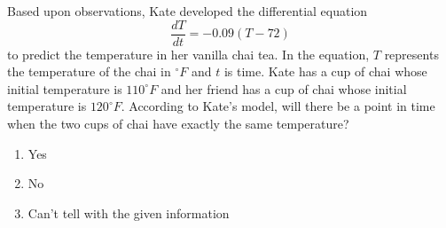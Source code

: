 \begin{problem}
    Based upon observations, Kate developed the differential equation 
    \[ \frac{dT}{dt}= -0.09(T-72) \]
    to predict the temperature in her vanilla chai tea.  In the equation, $T$ represents
    the temperature of the chai in $^\circ F$ and $t$ is time.  Kate has a cup of chai
    whose initial temperature is $110^\circ F$ and her friend has a cup of chai whose
    initial temperature is $120^\circ F$.  According to Kate's model, will there be a
    point in time when the two cups of chai have exactly the same temperature?
    \begin{enumerate}
        \item Yes
        \item No
        \item Can't tell with the given information
    \end{enumerate}
\end{problem}

